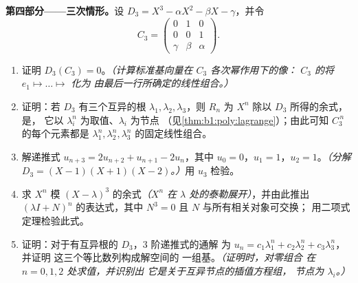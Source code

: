 \begin{problem}
\medskip
\noindent\textbf{第四部分——三次情形。}设 $D_3 = X^3 -
\alpha X^2 - \beta X - \gamma$，并令
\[
C_3 = \begin{pmatrix} 0 & 1 & 0\\ 0 & 0 & 1\\ \gamma & \beta &
\alpha \end{pmatrix}.
\]
\begin{enumerate}[resume]
  \item 证明 $D_3(C_3) = 0$。\emph{（计算标准基向量在
        $C_3$ 各次幂作用下的像：
        $C_3$ 的将 $e_1 \mapsto \dots \mapsto$ 化为
        由最后一行所确定的线性组合。）}
  \item 证明：若 $D_3$ 有三个互异的根 $\lambda_1,
        \lambda_2, \lambda_3$，则 $R_n$ 为 $X^n$
        除以 $D_3$ 所得的余式，是\emph{}，
        它以 $\lambda_i^n$ 为取值、$\lambda_i$ 为节点
        （见\cref{thm:b1:poly:lagrange}）；由此可知
        $C_3^{\,n}$ 的每个元素都是
        $\lambda_1^n, \lambda_2^n, \lambda_3^n$ 的固定线性组合。
  \item 解递推式 $u_{n+3} = 2u_{n+2} + u_{n+1} - 2u_n$，其中 $u_0 =
        0$，$u_1 = 1$，$u_2 = 1$。\emph{（分解 $D_3 = (X - 1)(X
        + 1)(X - 2)$。）}用 $u_3$ 检验。
  \item 求 $X^n$ 模 $(X -
        \lambda)^3$ 的余式\emph{（$X^n$ 在
        $\lambda$ 处的泰勒展开）}，并由此推出 $(\lambda I +
        N)^n$ 的表达式，其中 $N^3 = 0$ 且 $N$ 与所有相关对象可交换；
        用二项式定理检验此式。
  \item 证明：对于有互异根的 $D_3$，$3$ 阶递推式的通解
        为 $u_n = c_1
        \lambda_1^n + c_2\lambda_2^n + c_3\lambda_3^n$，并证明
        这三个等比数列构成解空间的
        一组基。\emph{（证明时，对零组合
        在 $n = 0, 1, 2$ 处求值，并识别出
        它是关于互异节点的插值方程组，
        节点为 $\lambda_i$。）}
\end{enumerate}


\end{problem}
